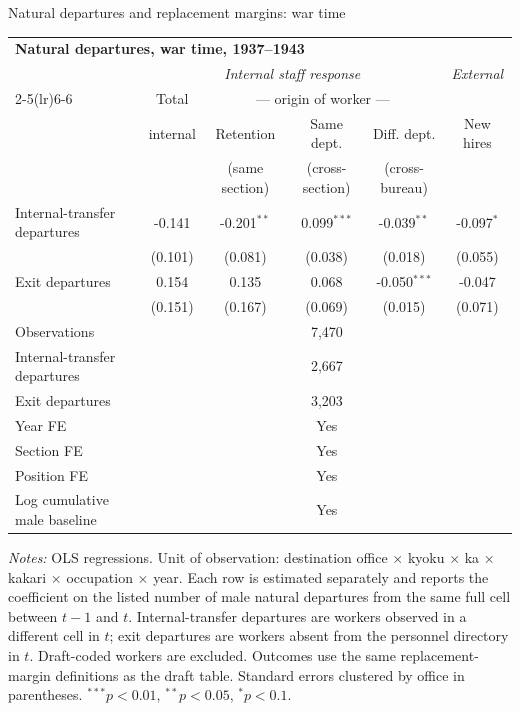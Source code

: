 \begin{frame}[t]{Natural departures and replacement margins: war time}
    \tiny
    \centering
    \begin{threeparttable}
    \begin{tabular}{lcccc|c}
        \toprule
        \multicolumn{6}{l}{\textbf{Natural departures, war time, 1937--1943}} \\[2pt]
        & \multicolumn{4}{c|}{\textit{Internal staff response}} & \textit{External} \\
        \cmidrule(lr){2-5}\cmidrule(lr){6-6}
         & Total & \multicolumn{3}{c|}{--- origin of worker ---} & \\
         & internal & Retention & Same dept. & Diff. dept. & New hires \\
         &  & (same section) & (cross-section) & (cross-bureau) & \\
        \midrule
        Internal-transfer departures & -0.141 & -0.201$^{**}$ & 0.099$^{***}$ & -0.039$^{**}$ & -0.097$^{*}$ \\
         & (0.101) & (0.081) & (0.038) & (0.018) & (0.055) \\
        Exit departures & 0.154 & 0.135 & 0.068 & -0.050$^{***}$ & -0.047 \\
         & (0.151) & (0.167) & (0.069) & (0.015) & (0.071) \\
        \midrule
        Observations & \multicolumn{5}{c}{7,470} \\
        Internal-transfer departures & \multicolumn{5}{c}{2,667} \\
        Exit departures & \multicolumn{5}{c}{3,203} \\
        Year FE & \multicolumn{5}{c}{Yes} \\
        Section FE & \multicolumn{5}{c}{Yes} \\
        Position FE & \multicolumn{5}{c}{Yes} \\
        Log cumulative male baseline & \multicolumn{5}{c}{Yes} \\
        \bottomrule
    \end{tabular}
    \begin{tablenotes}[flushleft]
        \tiny
        \item \textit{Notes:} OLS regressions. Unit of observation: destination office $\times$ kyoku $\times$ ka $\times$ kakari $\times$ occupation $\times$ year. Each row is estimated separately and reports the coefficient on the listed number of male natural departures from the same full cell between $t-1$ and $t$. Internal-transfer departures are workers observed in a different cell in $t$; exit departures are workers absent from the personnel directory in $t$. Draft-coded workers are excluded. Outcomes use the same replacement-margin definitions as the draft table. Standard errors clustered by office in parentheses. $^{***}p<0.01$, $^{**}p<0.05$, $^{*}p<0.1$.
    \end{tablenotes}
    \end{threeparttable}
\end{frame}

